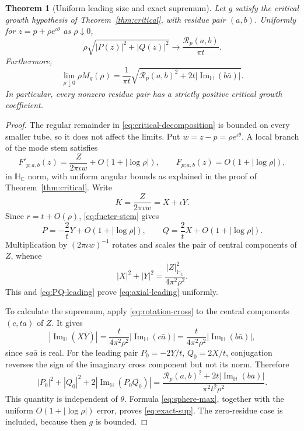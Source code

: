 \documentclass[11pt,a4paper]{article}
\numberwithin{equation}{section}
\newtheorem{theorem}{Theorem}[section]
\theoremstyle{definition}
\theoremstyle{remark}
\newcommand{\C}{\mathbb C}
\newcommand{\HH}{\mathbb H}
\newcommand{\HC}{\mathbb H_{\C}}
\newcommand{\ImH}{\operatorname{Im}_{\HH}}
\begin{document}
\begin{theorem}[Uniform leading size and exact supremum]
\label{thm:leading}
Let $g$ satisfy the critical growth hypothesis of
Theorem~\ref{thm:critical}, with residue pair $(a,b)$.
Uniformly for $z=p+\rho e^{\iota\theta}$ as $\rho\downarrow0$,
\begin{equation}
 \rho\sqrt{|P(z)|^2+|Q(z)|^2}
 \longrightarrow\frac{\mathcal R_p(a,b)}{\pi t}.\label{eq:axial-leading}
\end{equation}
Furthermore,
\begin{equation}
 \lim_{\rho\downarrow0}\rho M_g(\rho)
 =\frac1{\pi t}
   \sqrt{\mathcal R_p(a,b)^2+2t|\ImH(b\bar a)|}.
 \label{eq:exact-sup}
\end{equation}
In particular, every nonzero residue pair has a strictly positive
critical growth coefficient.
\end{theorem}
\begin{proof}
The regular remainder in \eqref{eq:critical-decomposition} is bounded
on every smaller tube, so it does not affect the limits. Put
$w=z-p=\rho e^{\iota\theta}$. A local branch of the mode stem satisfies
\begin{equation}
 F'_{p;a,b}(z)=\frac{Z}{2\pi\iota w}
                   +O(1+|\log\rho|),\qquad
 F_{p;a,b}(z)=O(1+|\log\rho|),\label{eq:stem-leading}
\end{equation}
in $\HC$ norm, with uniform angular bounds as explained in the proof
of Theorem~\ref{thm:critical}. Write
\[
 K=\frac{Z}{2\pi\iota w}=X+\iota Y.
\]
Since $r=t+O(\rho)$, \eqref{eq:fueter-stem} gives
\begin{equation}
 P=-\frac2tY+O(1+|\log\rho|),\qquad
 Q=\frac2tX+O(1+|\log\rho|).\label{eq:PQ-leading}
\end{equation}
Multiplication by $(2\pi\iota w)^{-1}$ rotates and scales the pair of
central components of $Z$, whence
\[
 |X|^2+|Y|^2=\frac{|Z|_{\HC}^2}{4\pi^2\rho^2}.
\]
This and \eqref{eq:PQ-leading} prove \eqref{eq:axial-leading} uniformly.

To calculate the supremum, apply \eqref{eq:rotation-cross} to the
central components $(c,ta)$ of $Z$. It gives
\[
 |\ImH(X\bar Y)|
  =\frac{t}{4\pi^2\rho^2}|\ImH(c\bar a)|
  =\frac{t}{4\pi^2\rho^2}|\ImH(b\bar a)|,
\]
since $s a\bar a$ is real. For the leading pair
$P_0=-2Y/t$, $Q_0=2X/t$, conjugation reverses the sign of the imaginary
cross component but not its norm. Therefore
\[
 |P_0|^2+|Q_0|^2+2|\ImH(P_0\overline{Q_0})|
 =\frac{\mathcal R_p(a,b)^2+2t|\ImH(b\bar a)|}
        {\pi^2t^2\rho^2}.
\]
This quantity is independent of $\theta$. Formula
\eqref{eq:sphere-max}, together with the uniform
$O(1+|\log\rho|)$ error, proves \eqref{eq:exact-sup}.
The zero-residue case is included, because then $g$ is bounded.
\end{proof}
\end{document}
